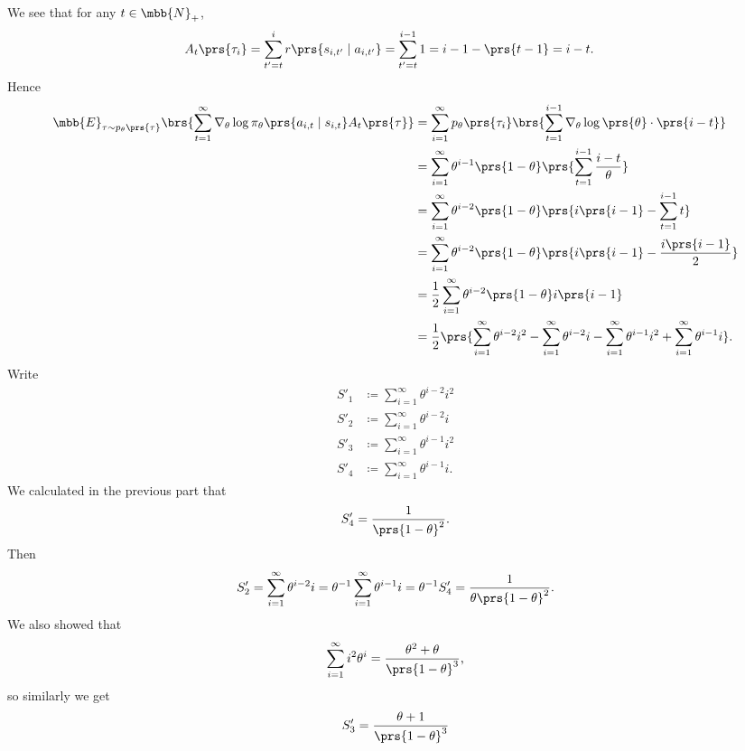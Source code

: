 \documentclass[10pt]{article}
\theoremstyle{definition}
\begin{document}
\begin{enumerate}
\begin{enumerate}[label=(\alph*)]
We see that for any $t \in \mbb{N}_+$,
\begin{align*}
A_t\prs{\tau_i} &= \sum_{t'=t}^i r\prs{s_{i,t'} \mid a_{i,t'}} = \sum_{t' = t}^{i-1} 1 = i-1-\prs{t-1} = i-t \text{.}
\end{align*}
Hence
\begin{align*}
\mbb{E}_{\tau \sim p_\theta\prs{\tau}}\brs{\sum_{t=1}^{\infty} \nabla_{\theta} \log \pi_\theta \prs{a_{i,t} \mid s_{i,t}} A_t\prs{\tau}} &=
\sum_{i=1}^{\infty} p_\theta\prs{\tau_i} \brs{\sum_{t = 1}^{i-1} \nabla_\theta \log\prs{\theta} \cdot \prs{i-t}}
\\&=
\sum_{i=1}^{\infty} \theta^{i-1} \prs{1-\theta} \prs{\sum_{t=1}^{i-1} \frac{i-t}{\theta}}
\\&=
\sum_{i=1}^{\infty} \theta^{i-2} \prs{1-\theta} \prs{i\prs{i-1} - \sum_{t=1}^{i-1} t}
\\&=
\sum_{i=1}^{\infty} \theta^{i-2} \prs{1-\theta} \prs{i\prs{i-1} - \frac{i\prs{i-1}}{2}}
\\&=
\frac{1}{2} \sum_{i=1}^{\infty} \theta^{i-2} \prs{1-\theta} i \prs{i-1} \\&=
\frac{1}{2} \prs{\sum_{i=1}^{\infty} \theta^{i-2} i^2 - \sum_{i=1}^{\infty} \theta^{i-2} i - \sum_{i=1}^{\infty} \theta^{i-1} i^2 + \sum_{i=1}^{\infty} \theta^{i-1} i} \text{.}
\end{align*}
Write
\begin{align*}
S'_1 &\coloneqq \sum_{i=1}^{\infty} \theta^{i-2} i^2 \\
S'_2 &\coloneqq \sum_{i=1}^{\infty} \theta^{i-2} i \\
S'_3 &\coloneqq \sum_{i=1}^{\infty} \theta^{i-1} i^2 \\
S'_4 &\coloneqq \sum_{i=1}^{\infty} \theta^{i-1} i \text{.}
\end{align*}
We calculated in the previous part that
\begin{align*}
S'_4 = \frac{1}{\prs{1-\theta}^2} \text{.}
\end{align*}
Then
\begin{align*}
S'_2 = \sum_{i=1}^{\infty} \theta^{i-2} i = \theta^{-1} \sum_{i=1}^{\infty} \theta^{i-1} i = \theta^{-1} S'_4 = \frac{1}{\theta \prs{1-\theta}^2} \text{.} 
\end{align*}
We also showed that
\begin{align*}
\sum_{i=1}^\infty i^2 \theta^i = \frac{\theta^2 + \theta}{\prs{1-\theta}^3} \text{,}
\end{align*}
so similarly we get
\begin{align*}
S'_3 = \frac{\theta + 1}{\prs{1-\theta}^3}

\end{align*}
\end{enumerate}
\end{enumerate}
\end{document}
